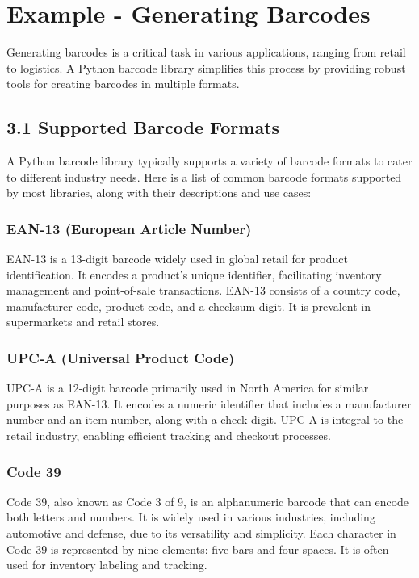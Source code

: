 \section{Example - Generating Barcodes}

Generating barcodes is a critical task in various applications, ranging from retail to logistics. A Python barcode library simplifies this process by providing robust tools for creating barcodes in multiple formats. 

\subsection{3.1 Supported Barcode Formats}

A Python barcode library typically supports a variety of barcode formats to cater to different industry needs. Here is a list of common barcode formats supported by most libraries, along with their descriptions and use cases:\\

\subsubsection{EAN-13 (European Article Number)}

EAN-13 is a 13-digit barcode widely used in global retail for product identification. It encodes a product's unique identifier, facilitating inventory management and point-of-sale transactions. EAN-13 consists of a country code, manufacturer code, product code, and a checksum digit. It is prevalent in supermarkets and retail stores.\cite{Barrera:2020}

\subsubsection{UPC-A (Universal Product Code)}

UPC-A is a 12-digit barcode primarily used in North America for similar purposes as EAN-13. It encodes a numeric identifier that includes a manufacturer number and an item number, along with a check digit. UPC-A is integral to the retail industry, enabling efficient tracking and checkout processes.

\subsubsection{Code 39}

Code 39, also known as Code 3 of 9, is an alphanumeric barcode that can encode both letters and numbers. It is widely used in various industries, including automotive and defense, due to its versatility and simplicity. Each character in Code 39 is represented by nine elements: five bars and four spaces. It is often used for inventory labeling and tracking.

